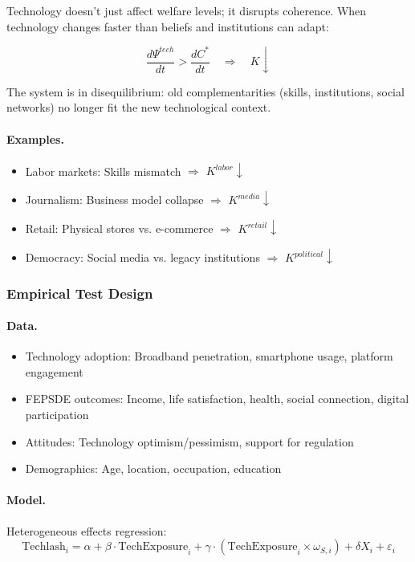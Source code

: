Technology doesn't just affect welfare levels; it disrupts coherence.
When technology changes faster than beliefs and institutions can adapt:

\begin{equation}
\frac{d\Psi^{tech}}{dt} > \frac{dC^*}{dt} \quad \Rightarrow \quad K \downarrow
\end{equation}

The system is in disequilibrium: old complementarities (skills, institutions, 
social networks) no longer fit the new technological context.

\paragraph{Examples.}
\begin{itemize}
  \item Labor markets: Skills mismatch $\Rightarrow$ $K^{labor} \downarrow$
  \item Journalism: Business model collapse $\Rightarrow$ $K^{media} \downarrow$
  \item Retail: Physical stores vs. e-commerce $\Rightarrow$ $K^{retail} \downarrow$
  \item Democracy: Social media vs. legacy institutions $\Rightarrow$ $K^{political} \downarrow$
\end{itemize}

\subsubsection{Empirical Test Design}

\paragraph{Data.}
\begin{itemize}
  \item Technology adoption: Broadband penetration, smartphone usage, platform engagement
  \item FEPSDE outcomes: Income, life satisfaction, health, social connection, digital participation
  \item Attitudes: Technology optimism/pessimism, support for regulation
  \item Demographics: Age, location, occupation, education
\end{itemize}

\paragraph{Model.}
Heterogeneous effects regression:
\begin{equation}
\text{Techlash}_i = \alpha + \beta \cdot \text{TechExposure}_i + \gamma \cdot (\text{TechExposure}_i \times \omega_{S,i}) + \delta X_i + \varepsilon_i
\end{equation}

